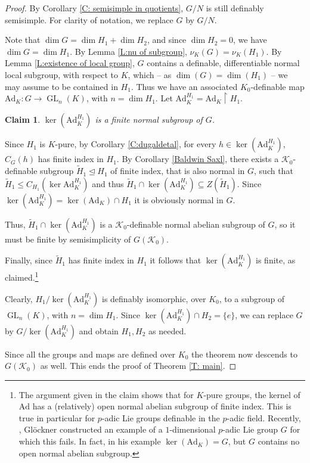 \documentclass[11pt]{amsart}
\DeclareMathOperator{\gl}{GL} \DeclareMathOperator{\agl}{AGL}
\newtheorem{claim}{Claim}[theorem]
\theoremstyle{definition}
\newcommand{\CK}{{\mathcal K}}
\newcommand{\0}{\emptyset}
\newcommand{\ad}{\mathrm{Ad}}
\newenvironment{claimproof}[1][\proofname]
  {%
    \proof[#1]%
      \renewcommand*\qedsymbol{$\square$ (claim)}%
  }
  {%
    \endproof%
  }
\begin{document}
\begin{proof}
By Corollary  \ref{C: semisimple in quotients}, $G/N$ is still definably semisimple. For clarity of notation, we replace $G$ by $G/N$.  


Note that $\dim G=\dim H_1+\dim H_2$, and since $\dim H_2=0$, we have $\dim G=\dim H_1$. By Lemma \ref{L:nu of subgroup}, $\nu_K(G)=\nu_K(H_1)$. By Lemma \ref{L:existence of local group},  $G$ contains a definable, differentiable normal local subgroup, with respect to $K$, which -- as $\dim(G)=\dim(H_1)$ -- we may assume to be contained in $H_1$. Thus we have  an associated $K_0$-definable map $\ad_K: G\to \gl_n(K)$, with $n=\dim H_1$. Let $\ad_K^{H_1}=\ad_K\restriction H_1$.





    \begin{claim}\label{C: last claim}
        $\ker(\ad_K^{H_1})$ is a finite normal subgroup of $G$.
    \end{claim}
    \begin{claimproof}
        Since $H_1$ is $K$-pure, by Corollary \ref{C:dugaldetal}, for every $h\in \ker(\ad_K^{H_1})$, $C_G(h)$ has finite index in $H_1$. By Corollary \ref{Baldwin Saxl}, there exists a $\CK_0$-definable subgroup $\widetilde H_1\trianglelefteq H_1$ of finite index, that is also normal in $G$, such that $\widetilde H_1\leq C_{H_1}(\ker \ad_K^{H_1})$ and thus $\widetilde H_1 \cap \ker(\ad_K^{H_1})\subseteq Z(\widetilde H_1)$.
        Since   $\ker(\ad_K^{H_1})=\ker(\ad_K)\cap H_1$ it is obviously normal in $G$.

        Thus, $\widetilde H_1\cap \ker(\ad_K^{H_1})$ is a $\CK_0$-definable normal abelian subgroup of $G$, so it must be finite by semisimplicity of $G(\CK_0)$.
        
        Finally, since $\widetilde H_1$ has finite index in $H_1$ it follows that $\ker(\ad_K^{H_1})$ is finite, as claimed.\footnote{The argument given in the claim shows that for $K$-pure groups, the kernel of $\ad$ has a (relatively) open normal abelian subgroup of finite index. This is true in particular for  $p$-adic Lie groups definable in the $p$-adic field. Recently,  \cite{helge-example},  Gl\"ockner constructed an example of a $1$-dimensional $p$-adic Lie group $G$ for which this fails. In fact, in his example $\ker (\ad_K)=G$, but $G$ contains no open normal abelian subgroup.}
    \end{claimproof}

Clearly, $H_1/\ker(\ad_K^{H_1})$ is definably isomorphic, over $K_0$, to a subgroup of $\gl_n(K)$, with $n=\dim H_1$. Since $\ker(\ad_K^{H_1})\cap H_2=\{e\}$, we can replace $G$ by $G/\ker(\ad_K^{H_1})$ and obtain $H_1,H_2$ as needed.

Since all the groups and maps are defined over $K_0$ the theorem now descends to $G(\CK_0)$ as well.  This ends the proof of Theorem \ref{T: main}.
\end{proof}
\end{document}

